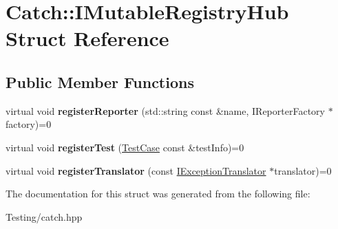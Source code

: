 \hypertarget{struct_catch_1_1_i_mutable_registry_hub}{\section{Catch\-:\-:I\-Mutable\-Registry\-Hub Struct Reference}
\label{struct_catch_1_1_i_mutable_registry_hub}
}
\subsection*{Public Member Functions}
\begin{DoxyCompactItemize}
\item 
\hypertarget{struct_catch_1_1_i_mutable_registry_hub_a1f61ed2b3f2d160b31a0f2c1d9a52af1}{virtual void {\bfseries register\-Reporter} (std\-::string const \&name, I\-Reporter\-Factory $\ast$factory)=0}\label{struct_catch_1_1_i_mutable_registry_hub_a1f61ed2b3f2d160b31a0f2c1d9a52af1}

\item 
\hypertarget{struct_catch_1_1_i_mutable_registry_hub_a11b85c6744d88c9f83fe16ad4a8dd451}{virtual void {\bfseries register\-Test} (\hyperlink{class_catch_1_1_test_case}{Test\-Case} const \&test\-Info)=0}\label{struct_catch_1_1_i_mutable_registry_hub_a11b85c6744d88c9f83fe16ad4a8dd451}

\item 
\hypertarget{struct_catch_1_1_i_mutable_registry_hub_ae6825365102693cf7707db022a2c2b49}{virtual void {\bfseries register\-Translator} (const \hyperlink{struct_catch_1_1_i_exception_translator}{I\-Exception\-Translator} $\ast$translator)=0}\label{struct_catch_1_1_i_mutable_registry_hub_ae6825365102693cf7707db022a2c2b49}

\end{DoxyCompactItemize}


The documentation for this struct was generated from the following file\-:\begin{DoxyCompactItemize}
\item 
Testing/catch.\-hpp\end{DoxyCompactItemize}
